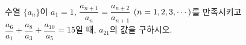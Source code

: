 수열 $\{a_n\}$이 $a_1=1$, $\dfrac{a_{n+1}}{a_n}=\dfrac{a_{n+2}}{a_{n+1}}$ $(n=1{,}\mkern3mu\mathopen{}2{,}\mkern3mu\mathopen{}3{,}\mkern3mu\mathopen{}\cdots)$를 만족시키고 $\dfrac{a_6}{a_1}+\dfrac{a_8}{a_3}+\dfrac{a_{10}}{a_5}=15$일 때, $a_{21}$의 값을 구하시오.
